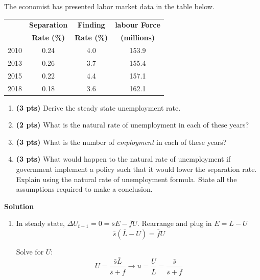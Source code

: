 \documentclass[addpoints,12pt,answers]{exam}
\begin{document}
\begin{enumerate}[label=\textbf{\arabic*.}, itemsep=15pt]
		The economist has presented labor market data in the table below.
		\begin{table}[htbp]
			\centering
			\begin{tabular}{rccc}
				\toprule
				& \textbf{Separation } & \textbf{Finding } & \textbf{labour Force} \\
				&   \textbf{Rate (\%) }   &   \textbf{Rate (\%)}    & \textbf{(millions)} \\
				\midrule
				2010  & 0.24   & 4.0   & 153.9 \\
				2013  & 0.26   & 3.7   & 155.4 \\
				2015  & 0.22   & 4.4   & 157.1 \\
				2018  & 0.18   & 3.6   & 162.1 \\
				\bottomrule
			\end{tabular}%
		\end{table}%
		
		\begin{enumerate}[label=(\alph*)]
			\item \textbf{(3 pts)} Derive the steady state unemployment rate.
			\item \textbf{(2 pts)} What is the natural rate of unemployment in each of these years? 
			\item \textbf{(3 pts)} What is the number of \textit{employment} in each of these years?
			\item \textbf{(3 pts)} What would happen to the natural rate of unemployment if government implement a policy such that it would lower the separation rate. Explain using the natural rate of unemployment formula. State all the assumptions required to make a conclusion.
		\end{enumerate}
		
		\clearpage
		\textbf{Solution}
		\begin{enumerate}[label=(\alph*)]
			\item 
			
				In steady state, $\Delta U_{t+1} = 0 = \bar{s} E - \bar{f} U$. Rearrange and plug in $E = \bar{L}-U$
				\[\bar{s} (\bar{L}-U) = \bar{f} U\]
				
				Solve for $U$:
				\[U = \frac{\bar{s}\bar{L}}{\bar{s}+\bar{f}} \to u = \frac{U}{\bar{L}} = \frac{\bar{s}}{\bar{s}+\bar{f}} \]
				

\end{enumerate}
\end{enumerate}
\end{document}
